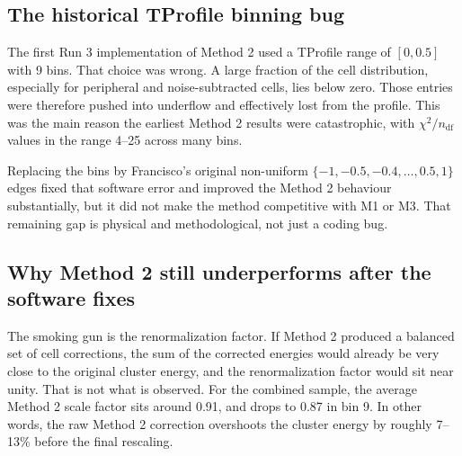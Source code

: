 \documentclass[11pt,a4paper]{article}
\newcommand{\chisq}{\ensuremath{\chi^2 / n_{\mathrm{df}}}}
\begin{document}
\subsection{The historical TProfile binning bug}

The first Run 3 implementation of Method 2 used a TProfile range of $[0,0.5]$
with 9 bins. That choice was wrong. A large fraction of the cell distribution,
especially for peripheral and noise-subtracted cells, lies below zero. Those
entries were therefore pushed into underflow and effectively lost from the
profile. This was the main reason the earliest Method 2 results were
catastrophic, with \chisq values in the range 4--25 across many bins.

Replacing the bins by Francisco's original non-uniform
$\{-1,-0.5,-0.4,\ldots,0.5,1\}$ edges fixed that software error and improved
the Method 2 behaviour substantially, but it did not make the method
competitive with M1 or M3. That remaining gap is physical and methodological,
not just a coding bug.

\subsection{Why Method 2 still underperforms after the software fixes}

The smoking gun is the renormalization factor. If Method 2 produced a balanced
set of cell corrections, the sum of the corrected energies would already be very
close to the original cluster energy, and the renormalization factor would sit
near unity. That is not what is observed. For the combined sample, the average
Method 2 scale factor sits around 0.91, and drops to 0.87 in bin 9. In other
words, the raw Method 2 correction overshoots the cluster energy by roughly
7--13\% before the final rescaling.
\end{document}
